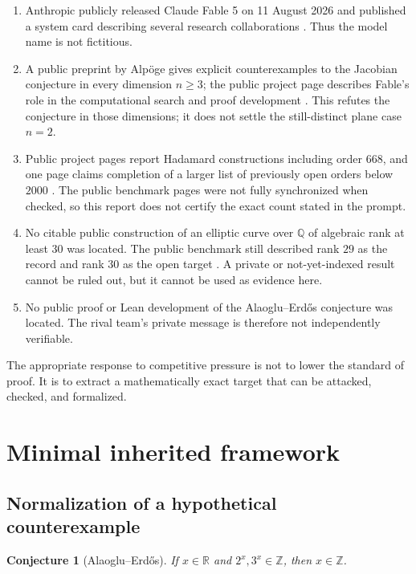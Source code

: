 \documentclass[11pt]{article}
\newtheorem{conjecture}[theorem]{Conjecture}
\theoremstyle{definition}
\theoremstyle{remark}
\newcommand{\Z}{\mathbb Z}
\newcommand{\Q}{\mathbb Q}
\newcommand{\R}{\mathbb R}
\begin{document}
\begin{enumerate}
\item Anthropic publicly released Claude Fable 5 on 11 August 2026 and published a system card describing several research collaborations \cite{AnthropicFable,AnthropicSystemCard}.  Thus the model name is not fictitious.
\item A public preprint by Alp\"oge gives explicit counterexamples to the Jacobian conjecture in every dimension $n\ge3$; the public project page describes Fable's role in the computational search and proof development \cite{AlpogeJacobian,ByClaudeJacobian}.  This refutes the conjecture in those dimensions; it does not settle the still-distinct plane case $n=2$.
\item Public project pages report Hadamard constructions including order $668$, and one page claims completion of a larger list of previously open orders below $2000$ \cite{ByClaudeHadamard,VibeHadamard}.  The public benchmark pages were not fully synchronized when checked, so this report does not certify the exact count stated in the prompt.
\item No citable public construction of an elliptic curve over $\Q$ of algebraic rank at least $30$ was located.  The public benchmark still described rank $29$ as the record and rank $30$ as the open target \cite{VibeRank30}.  A private or not-yet-indexed result cannot be ruled out, but it cannot be used as evidence here.
\item No public proof or Lean development of the Alaoglu--Erd\H{o}s conjecture was located.  The rival team's private message is therefore not independently verifiable.
\end{enumerate}

The appropriate response to competitive pressure is not to lower the standard of proof.  It is to extract a mathematically exact target that can be attacked, checked, and formalized.

\section{Minimal inherited framework}\label{sec:grid}

\subsection{Normalization of a hypothetical counterexample}

\begin{conjecture}[Alaoglu--Erd\H{o}s]
If $x\in\R$ and $2^x,3^x\in\Z$, then $x\in\Z$.
\end{conjecture}
\end{document}
